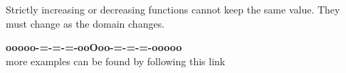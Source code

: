 \documentclass{ximera}
\begin{document}
Strictly increasing or decreasing functions cannot keep the same value.  They must change as the domain changes.














\begin{center}
\textbf{\textcolor{green!50!black}{ooooo-=-=-=-ooOoo-=-=-=-ooooo}} \\

more examples can be found by following this link\\ 

\end{center}
\end{document}
